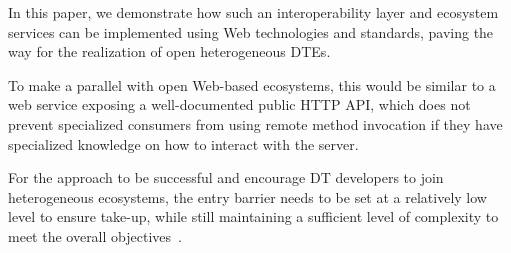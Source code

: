 In this paper, we demonstrate how such an interoperability layer and ecosystem services can be implemented using Web technologies and standards, paving the way for the realization of open heterogeneous \acp{DTE}.

To make a parallel with open Web-based ecosystems, this would be similar to a web service exposing a well-documented public HTTP API, which does not prevent specialized consumers from using remote method invocation if they have specialized knowledge on how to interact with the server.

For the approach to be successful and encourage \ac{DT} developers to join heterogeneous ecosystems, the entry barrier needs to be set at a relatively low level to ensure take-up, while still maintaining a sufficient level of complexity to meet the overall objectives~\cite{kendall2021ndt}.

